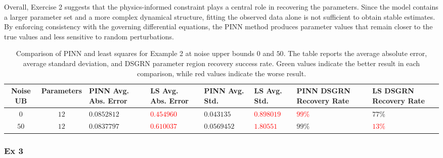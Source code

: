 \documentclass[11pt]{article}
\begin{document}
Overall, Exercise 2 suggests that the physics-informed constraint plays a central role in recovering the parameters. Since the model contains a larger parameter set and a more complex dynamical structure, fitting the observed data alone is not sufficient to obtain stable estimates. By enforcing consistency with the governing differential equations, the PINN method produces parameter values that remain closer to the true values and less sensitive to random perturbations.
\begin{table}[H]
\centering
\scriptsize
\renewcommand{\arraystretch}{1.25}
\setlength{\tabcolsep}{3pt}
\begin{tabularx}{\textwidth}{|c|c|
>{\centering\arraybackslash}X|
>{\centering\arraybackslash}X|
>{\centering\arraybackslash}X|
>{\centering\arraybackslash}X|
>{\centering\arraybackslash}X|
>{\centering\arraybackslash}X|}
\hline
\textbf{Noise UB} &
\textbf{Parameters} &
\textbf{PINN Avg. Abs. Error} &
\textbf{LS Avg. Abs. Error} &
\textbf{PINN Avg. Std.} &
\textbf{LS Avg. Std.} &
\textbf{PINN DSGRN Recovery Rate} &
\textbf{LS DSGRN Recovery Rate} \\
\hline

\(0\) & \(12\)
& \textcolor{green!50!black}{\(0.0852812\)}
& \textcolor{red}{\(0.454960\)}
& \textcolor{green!50!black}{\(0.043135\)}
& \textcolor{red}{\(0.898019\)}
& \textcolor{red}{\(99\%\)}
& \textcolor{green!50!black}{\(77\%\)} \\
\hline

\(50\) & \(12\)
& \textcolor{green!50!black}{\(0.0837797\)}
& \textcolor{red}{\(0.610037\)}
& \textcolor{green!50!black}{\(0.0569452\)}
& \textcolor{red}{\(1.80551\)}
& \textcolor{green!50!black}{\(99\%\)}
& \textcolor{red}{\(13\%\)} \\
\hline

\end{tabularx}
\caption{Comparison of PINN and least squares for Example 2 at noise upper bounds \(0\) and \(50\). The table reports the average absolute error, average standard deviation, and DSGRN parameter region recovery success rate. Green values indicate the better result in each comparison, while red values indicate the worse result.}
\label{tab:ex2-error-std-comparison}
\end{table}
\subsubsection{Ex 3}
\end{document}

